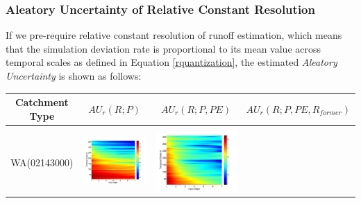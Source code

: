 \documentclass[draft,wrr]{AGUTeX}
\begin{document}
\begin{article}
\subsubsection{Aleatory Uncertainty of Relative Constant Resolution}
If we pre-require relative constant resolution of runoff estimation, which means that the simulation deviation rate is proportional to its mean value across temporal scales as  defined in Equation \eqref{rquantization}, the estimated \emph{Aleatory Uncertainty} is shown as follows:
\begin{table}[H]  \small 

\label{table:RAU}
\centering
\begin{tabular}{cccc}
\hline
\textbf{Catchment Type}&\textbf{$AU_r(R;P)$}&\textbf{$AU_r(R;P,PE)$}&\textbf{$AU_r(R;P,PE,R_{former})$}\\
\hline
\\
WA(02143000)
&\begin{minipage}{.3\textwidth}\includegraphics[width=\linewidth]{resultgraph/02143000p_rela.png}\end{minipage}
&\begin{minipage}{.3\textwidth}\includegraphics[width=\linewidth]{resultgraph/02143000pep_rela.png}\end{minipage}

\end{tabular}
\end{table}
\end{article}
\end{document}
